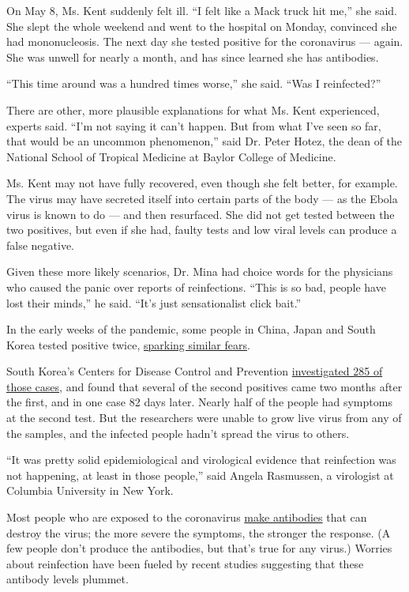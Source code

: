On May 8, Ms. Kent suddenly felt ill. ``I felt like a Mack truck hit
me,'' she said. She slept the whole weekend and went to the hospital on
Monday, convinced she had mononucleosis. The next day she tested
positive for the coronavirus --- again. She was unwell for nearly a
month, and has since learned she has antibodies.

``This time around was a hundred times worse,'' she said. ``Was I
reinfected?''

There are other, more plausible explanations for what Ms. Kent
experienced, experts said. ``I'm not saying it can't happen. But from
what I've seen so far, that would be an uncommon phenomenon,'' said Dr.
Peter Hotez, the dean of the National School of Tropical Medicine at
Baylor College of Medicine.

Ms. Kent may not have fully recovered, even though she felt better, for
example. The virus may have secreted itself into certain parts of the
body --- as the Ebola virus is known to do --- and then resurfaced. She
did not get tested between the two positives, but even if she had,
faulty tests and low viral levels can produce a false negative.

Given these more likely scenarios, Dr. Mina had choice words for the
physicians who caused the panic over reports of reinfections. ``This is
so bad, people have lost their minds,'' he said. ``It's just
sensationalist click bait.''

In the early weeks of the pandemic, some people in China, Japan and
South Korea tested positive twice,
\href{https://www.nytimes3xbfgragh.onion/2020/02/29/health/coronavirus-reinfection.html}{sparking
similar fears}.

South Korea's Centers for Disease Control and Prevention
\href{https://www.cdc.go.kr/board/board.es?mid=a30402000000\&bid=0030}{investigated
285 of those cases}, and found that several of the second positives came
two months after the first, and in one case 82 days later. Nearly half
of the people had symptoms at the second test. But the researchers were
unable to grow live virus from any of the samples, and the infected
people hadn't spread the virus to others.

``It was pretty solid epidemiological and virological evidence that
reinfection was not happening, at least in those people,'' said Angela
Rasmussen, a virologist at Columbia University in New York.

Most people who are exposed to the coronavirus
\href{https://www.nytimes3xbfgragh.onion/2020/05/07/health/coronavirus-antibody-prevalence.html}{make
antibodies} that can destroy the virus; the more severe the symptoms,
the stronger the response. (A few people don't produce the antibodies,
but that's true for any virus.) Worries about reinfection have been
fueled by recent studies suggesting that these antibody levels plummet.

